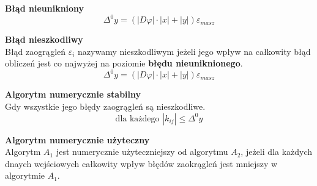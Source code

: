 \documentclass[../mn-notatki.tex]{subfiles}
\begin{document}
\begin{tcolorbox}
\textbf{Błąd nieunikniony}\\
\[
\Delta^0y = \left(|D\varphi|\cdot|x| + |y| \right)\varepsilon_{masz}
\]
\end{tcolorbox}

\begin{tcolorbox}
\textbf{Błąd nieszkodliwy}\\
Błąd zaogrągleń $\varepsilon_i$ nazywamy nieszkodliwym jeżeli jego wpływ na
całkowity błąd obliczeń jest co najwyżej na poziomie \textbf{błędu nieuniknionego}.\\
\[
\Delta^0y = \left(|D\varphi|\cdot|x| + |y| \right)\varepsilon_{masz}
\]
\end{tcolorbox}

\begin{tcolorbox}
\textbf{Algorytm numerycznie stabilny}\\
Gdy wszystkie jego błędy zaogrągleń są nieszkodliwe.
\[
\text{dla każdego~} |k_{ij}|\leqslant \Delta^0y
\]
\end{tcolorbox}

\begin{tcolorbox}
\textbf{Algorytm numerycznie użyteczny}\\
Algorytm $A_1$ jest numerycznie użyteczniejszy od algorytmu $A_2$, jeżeli dla
każdych dnaych wejściowych całkowity wpływ błędów zaokrągleń jest mniejszy
w algorytmie $A_1$.
\end{tcolorbox}

\pagebreak
\end{document}
